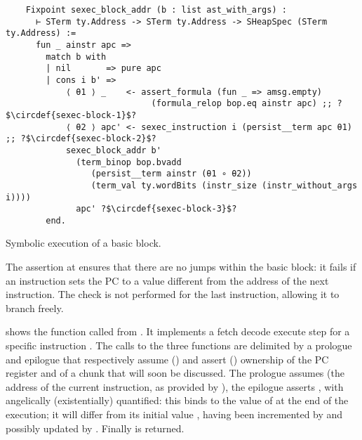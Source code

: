 \begin{listing}[htb]
  \startcstep
  \begin{verbatim}
    Fixpoint sexec_block_addr (b : list ast_with_args) :
      ⊢ STerm ty.Address -> STerm ty.Address -> SHeapSpec (STerm ty.Address) :=
      fun _ ainstr apc =>
        match b with
        | nil       => pure apc
        | cons i b' =>
            ⟨ θ1 ⟩ _    <- assert_formula (fun _ => amsg.empty)
                             (formula_relop bop.eq ainstr apc) ;; ?$\circdef{sexec-block-1}$?
            ⟨ θ2 ⟩ apc' <- sexec_instruction i (persist__term apc θ1) ;; ?$\circdef{sexec-block-2}$?
            sexec_block_addr b'
              (term_binop bop.bvadd
                 (persist__term ainstr (θ1 ∘ θ2))
                 (term_val ty.wordBits (instr_size (instr_without_args i))))
              apc' ?$\circdef{sexec-block-3}$?
        end.
  \end{verbatim}
  \caption{Symbolic execution of a basic block.}
  \label{lst:sexec-block}
\end{listing}

The assertion at  ensures that there are no jumps within the basic block: it fails if an instruction sets the PC to a value different from the address of the next instruction. The check is not performed for the last instruction, allowing it to branch freely.


 shows the  function called from . It implements a fetch  decode  execute  step for a specific instruction . The calls to the three functions are delimited by a prologue and epilogue  that respectively assume () and assert () ownership of the PC register and of a  chunk that will soon be discussed. The prologue assumes  (the address of the current instruction, as provided by ), the epilogue asserts , with  angelically (existentially) quantified: this binds  to the value of  at the end of the execution; it will differ from its initial value , having been incremented by  and possibly updated by . Finally  is returned.

